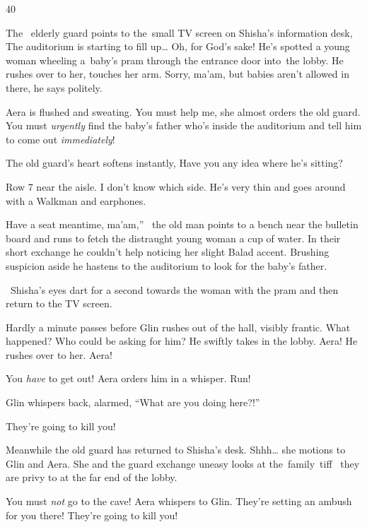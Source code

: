 \documentclass[letterpaper]{article}
\begin{document}
40 

The ~elderly guard points to the~small TV screen on Shisha's information desk, {\textquotedbl}The auditorium is starting
to fill up{\dots} Oh, for God's sake!{\textquotedbl} He's spotted a young woman wheeling a~baby's pram through the
entrance door into~the lobby. He rushes{ }over to her, touches her arm.
{\textquotedbl}Sorry, ma'am, but babies aren't allowed in there,{\textquotedbl} he says politely.

Aera is flushed and sweating. {\textquotedbl}You must help me,{\textquotedbl} she almost orders the old guard.
{\textquotedbl}You must \textit{urgently} find the baby's father who's inside the auditorium and tell him to come out
\textit{immediately}!{\textquotedbl} 

The old guard's heart softens instantly, {\textquotedbl}Have you any idea where he's sitting?{\textquotedbl}

{\textquotedbl}Row 7 near the aisle. I don't know which side. He's very thin and goes around with a Walkman and
earphones.{\textquotedbl} 

{\textquotedbl}Have a seat meantime, ma'am,'' \ the old man points to a bench near the bulletin board and runs to fetch
the distraught young woman a cup of water. In their short exchange he couldn't help noticing her slight Balad accent.
Brushing suspicion aside he hastens to the auditorium to look for the baby's father.

~Shisha's eyes dart for a second towards the woman with{ }the pram and then
return to the TV screen.

Hardly a minute passes before Glin rushes out of the hall, visibly frantic. What happened? Who could be asking for him?
He swiftly takes in the lobby. Aera! He rushes over to her. {\textquotedbl}Aera!{\textquotedbl} 

{\textquotedbl}You \textit{have} to get out!{\textquotedbl} Aera orders him in a whisper.
{\textquotedbl}Run!{\textquotedbl} 

Glin whispers back, alarmed{, }{}``What are you doing here?!'' 

{\textquotedbl}They're going to kill you!{\textquotedbl}

Meanwhile the old guard has returned to Shisha's desk. {\textquotedbl}Shhh{\dots}{\textquotedbl} she motions to Glin and
Aera. She and the guard exchange {uneasy looks }at the~family~tiff \ they are
privy to at the far end of the lobby.\textbf{ }

{\textquotedbl}You\textit{ }must\textit{ not} go to the cave!{\textquotedbl} Aera whispers to Glin.
{\textquotedbl}They're setting an ambush for you there! They're going to kill you!{\textquotedbl} 
\end{document}
